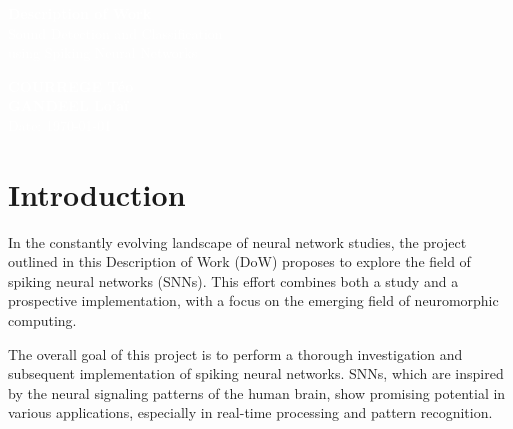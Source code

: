 \documentclass[11pt]{article}
\begin{document}
\pagecolor{darkbluegrey}
\afterpage{\nopagecolor}


\begin{titlepage}
  \begin{center}
    \textcolor{white}{\textbf{\Huge Description of Work}}\\ %
    \vspace{1cm}
    \textcolor{white}{\Large Sound Detection and Classification\\using Spiking Neural Networks} %
    \vspace{3cm}
  \end{center}
  \begin{center}
    \textcolor{white}{ %
      \textbf{COURREGE Téo}\\
      \textbf{GANDEEL Lo'aï}\\
      \vspace{1cm}
      \Large Date: \today}
  \end{center}
\end{titlepage}

\newpage

\tableofcontents

\pagebreak

\section{Introduction}

In the constantly evolving landscape of neural network studies, the project outlined in this Description of Work (DoW) proposes to explore the field of spiking neural networks (SNNs). This effort combines both a study and a prospective implementation, with a focus on the emerging field of neuromorphic computing.

The overall goal of this project is to perform a thorough investigation and subsequent implementation of spiking neural networks. SNNs, which are inspired by the neural signaling patterns of the human brain, show promising potential in various applications, especially in real-time processing and pattern recognition.
\end{document}

